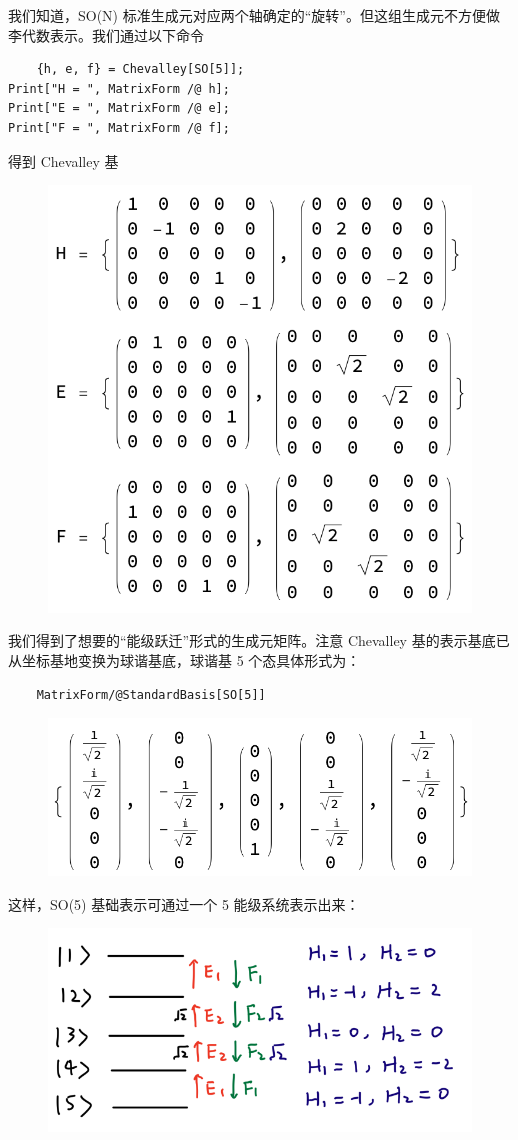 \documentclass[UTF8]{ctexart}
\begin{document}
\noindent 我们知道，SO(N) 标准生成元对应两个轴确定的“旋转”。但这组生成元不方便做李代数表示。我们通过以下命令

\begin{verbatim}
	{h, e, f} = Chevalley[SO[5]];
Print["H = ", MatrixForm /@ h];
Print["E = ", MatrixForm /@ e];
Print["F = ", MatrixForm /@ f];
\end{verbatim}
得到 Chevalley 基

\begin{figure}[H]
\begin{centering}
\includegraphics[width=0.4\linewidth]{include/O11}
\par\end{centering}
\end{figure}

\noindent 我们得到了想要的“能级跃迁”形式的生成元矩阵。注意 Chevalley 基的表示基底已从坐标基地变换为球谐基底，球谐基 5 个态具体形式为：

\begin{verbatim}
	MatrixForm/@StandardBasis[SO[5]]
\end{verbatim}

\begin{figure}[H]
\begin{centering}
\includegraphics[width=0.4\linewidth]{include/O12}
\par\end{centering}
\end{figure}

\noindent 这样，SO(5) 基础表示可通过一个 5 能级系统表示出来：

\begin{figure}[H]
\begin{centering}
\includegraphics[width=0.5\linewidth]{include/P3}
\par\end{centering}
\end{figure}
\end{document}
